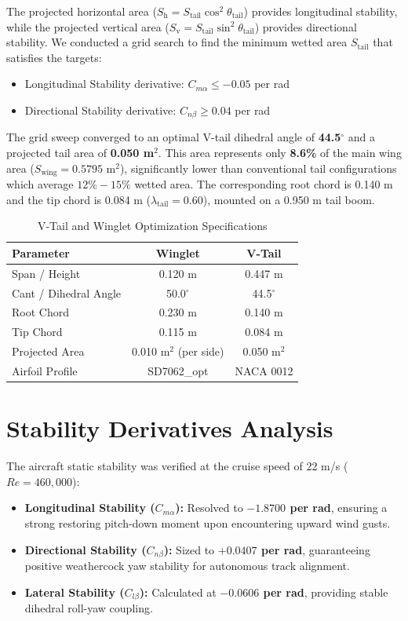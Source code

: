 \documentclass[11pt]{article}
\begin{document}
The projected horizontal area ($S_{\text{h}} = S_{\text{tail}} \cos^2\theta_{\text{tail}}$) provides longitudinal stability, while the projected vertical area ($S_{\text{v}} = S_{\text{tail}} \sin^2\theta_{\text{tail}}$) provides directional stability. We conducted a grid search to find the minimum wetted area $S_{\text{tail}}$ that satisfies the targets:
\begin{itemize}
    \item Longitudinal Stability derivative: $C_{m\alpha} \le -0.05$ per rad
    \item Directional Stability derivative: $C_{n\beta} \ge 0.04$ per rad
\end{itemize}

The grid sweep converged to an optimal V-tail dihedral angle of \textbf{44.5$^\circ$} and a projected tail area of \textbf{0.050 m$^2$}. This area represents only \textbf{8.6\%} of the main wing area ($S_{\text{wing}} = 0.5795$ m$^2$), significantly lower than conventional tail configurations which average $12\% - 15\%$ wetted area. The corresponding root chord is 0.140 m and the tip chord is 0.084 m ($\lambda_{\text{tail}} = 0.60$), mounted on a 0.950 m tail boom.

\begin{table}[h]
\centering
\caption{V-Tail and Winglet Optimization Specifications}
\label{tab:specs}
\begin{tabular}{lcc}
\toprule
Parameter & Winglet & V-Tail \\
\midrule
Span / Height & 0.120 m & 0.447 m \\
Cant / Dihedral Angle & 50.0$^\circ$ & 44.5$^\circ$ \\
Root Chord & 0.230 m & 0.140 m \\
Tip Chord & 0.115 m & 0.084 m \\
Projected Area & 0.010 m$^2$ (per side) & 0.050 m$^2$ \\
Airfoil Profile & SD7062\_opt & NACA 0012 \\
\bottomrule
\end{tabular}
\end{table}

\section{Stability Derivatives Analysis}
The aircraft static stability was verified at the cruise speed of 22 m/s ($Re = 460,000$):
\begin{itemize}
    \item \textbf{Longitudinal Stability ($C_{m\alpha}$):} Resolved to \textbf{$-1.8700$ per rad}, ensuring a strong restoring pitch-down moment upon encountering upward wind gusts.
    \item \textbf{Directional Stability ($C_{n\beta}$):} Sized to \textbf{$+0.0407$ per rad}, guaranteeing positive weathercock yaw stability for autonomous track alignment.
    \item \textbf{Lateral Stability ($C_{l\beta}$):} Calculated at \textbf{$-0.0606$ per rad}, providing stable dihedral roll-yaw coupling.
\end{itemize}
\end{document}
